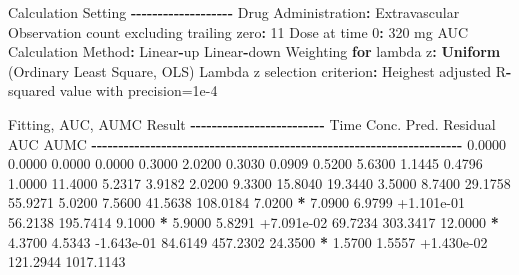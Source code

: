 \documentclass[
  12pt,
]{krantz}
\newenvironment{Shaded}{\begin{snugshade}}{\end{snugshade}}
\newcommand{\ControlFlowTok}[1]{\textcolor[rgb]{0.13,0.29,0.53}{\textbf{#1}}}
\newcommand{\DecValTok}[1]{\textcolor[rgb]{0.00,0.00,0.81}{#1}}
\newcommand{\FloatTok}[1]{\textcolor[rgb]{0.00,0.00,0.81}{#1}}
\newcommand{\KeywordTok}[1]{\textcolor[rgb]{0.13,0.29,0.53}{\textbf{#1}}}
\newcommand{\NormalTok}[1]{#1}
\newcommand{\OperatorTok}[1]{\textcolor[rgb]{0.81,0.36,0.00}{\textbf{#1}}}
\newcommand{\StringTok}[1]{\textcolor[rgb]{0.31,0.60,0.02}{#1}}
\begin{document}
\begin{Shaded}
\begin{Highlighting}[]
\NormalTok{Calculation Setting}
\OperatorTok{{-}{-}{-}{-}{-}{-}{-}{-}{-}{-}{-}{-}{-}{-}{-}{-}{-}{-}{-}}
\NormalTok{Drug Administration}\OperatorTok{:}\StringTok{ }\NormalTok{Extravascular}
\NormalTok{Observation count excluding trailing zero}\OperatorTok{:}\StringTok{ }\DecValTok{11}
\NormalTok{Dose at time }\DecValTok{0}\OperatorTok{:}\StringTok{ }\DecValTok{320}\NormalTok{ mg}
\NormalTok{AUC Calculation Method}\OperatorTok{:}\StringTok{ }\NormalTok{Linear}\OperatorTok{{-}}\NormalTok{up Linear}\OperatorTok{{-}}\NormalTok{down}
\NormalTok{Weighting }\ControlFlowTok{for}\NormalTok{ lambda z}\OperatorTok{:}\StringTok{ }\KeywordTok{Uniform}\NormalTok{ (Ordinary Least Square, OLS)}
\NormalTok{Lambda z selection criterion}\OperatorTok{:}\StringTok{ }\NormalTok{Heighest adjusted R}\OperatorTok{{-}}\NormalTok{squared value with precision=}\FloatTok{1e{-}4}


\NormalTok{Fitting, AUC, AUMC Result}
\OperatorTok{{-}{-}{-}{-}{-}{-}{-}{-}{-}{-}{-}{-}{-}{-}{-}{-}{-}{-}{-}{-}{-}{-}{-}{-}{-}}
\StringTok{      }\NormalTok{Time         Conc.      Pred.   Residual       AUC       AUMC}
\OperatorTok{{-}{-}{-}{-}{-}{-}{-}{-}{-}{-}{-}{-}{-}{-}{-}{-}{-}{-}{-}{-}{-}{-}{-}{-}{-}{-}{-}{-}{-}{-}{-}{-}{-}{-}{-}{-}{-}{-}{-}{-}{-}{-}{-}{-}{-}{-}{-}{-}{-}{-}{-}{-}{-}{-}{-}{-}{-}{-}{-}{-}{-}{-}{-}{-}{-}{-}{-}{-}{-}}
\StringTok{     }\FloatTok{0.0000}       \FloatTok{0.0000}                           \FloatTok{0.0000}     \FloatTok{0.0000}
     \FloatTok{0.3000}       \FloatTok{2.0200}                           \FloatTok{0.3030}     \FloatTok{0.0909}
     \FloatTok{0.5200}       \FloatTok{5.6300}                           \FloatTok{1.1445}     \FloatTok{0.4796}
     \FloatTok{1.0000}      \FloatTok{11.4000}                           \FloatTok{5.2317}     \FloatTok{3.9182}
     \FloatTok{2.0200}       \FloatTok{9.3300}                          \FloatTok{15.8040}    \FloatTok{19.3440}
     \FloatTok{3.5000}       \FloatTok{8.7400}                          \FloatTok{29.1758}    \FloatTok{55.9271}
     \FloatTok{5.0200}       \FloatTok{7.5600}                          \FloatTok{41.5638}   \FloatTok{108.0184}
     \FloatTok{7.0200} \OperatorTok{*}\StringTok{     }\FloatTok{7.0900}     \FloatTok{6.9799} \FloatTok{+1.101e{-}01}    \FloatTok{56.2138}   \FloatTok{195.7414}
     \FloatTok{9.1000} \OperatorTok{*}\StringTok{     }\FloatTok{5.9000}     \FloatTok{5.8291} \FloatTok{+7.091e{-}02}    \FloatTok{69.7234}   \FloatTok{303.3417}
    \FloatTok{12.0000} \OperatorTok{*}\StringTok{     }\FloatTok{4.3700}     \FloatTok{4.5343} \FloatTok{{-}1.643e{-}01}    \FloatTok{84.6149}   \FloatTok{457.2302}
    \FloatTok{24.3500} \OperatorTok{*}\StringTok{     }\FloatTok{1.5700}     \FloatTok{1.5557} \FloatTok{+1.430e{-}02}   \FloatTok{121.2944}  \FloatTok{1017.1143}


\end{Highlighting}
\end{Shaded}
\end{document}
